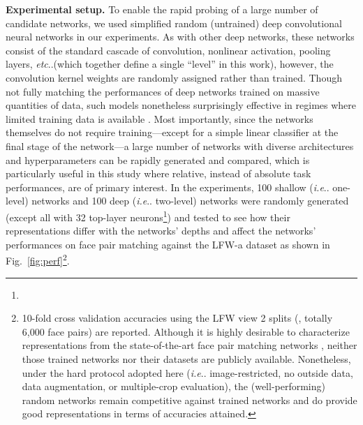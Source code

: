 \documentclass[fleqn]{article} %
\makeatletter
\DeclareRobustCommand\onedot{\futurelet\@let@token\@onedot}
\def\@onedot{\ifx\@let@token.\else.\null\fi\xspace}
\def\eg{\emph{e.g}\onedot} \def\Eg{\emph{E.g}\onedot}
\def\ie{\emph{i.e}\onedot} \def\Ie{\emph{I.e}\onedot}
\def\etc{\emph{etc}\onedot} \def\vs{\emph{vs}\onedot}
\makeatother
\begin{document}
\newcommand{\expperf}{10-fold cross validation accuracies using the LFW view 2 splits (\cite{LFWTech}, totally 6,000 face pairs) are reported.
Although it is highly desirable to characterize representations from the state-of-the-art face pair matching networks \cite{taigman2014deepface, sun2014deep, schroff2015facenet}, neither those trained networks nor their datasets are publicly available.
Nonetheless, under the hard protocol adopted here (\ie image-restricted, no outside data, data augmentation, or multiple-crop evaluation), the (well-performing) random networks remain competitive against trained networks and do provide good representations in terms of accuracies attained.
} 

{\bf Experimental setup.}
To enable the rapid probing of a large number of candidate networks, we used simplified random (untrained) deep convolutional neural networks \cite{cox2011beyond, sthor} in our experiments.
As with other deep networks, these networks consist of the standard cascade of convolution, nonlinear activation, pooling layers, \etc (which together define a single ``level'' in this work), however, the convolution kernel weights are randomly assigned rather than trained.
Though not fully matching the performances of deep networks trained on massive quantities of data, such models nonetheless surprisingly effective in regimes where limited training data is available \cite{cox2011beyond}. %
Most importantly, since the networks themselves do not require training---except for a simple linear classifier at the final stage of the network---a large number of networks with diverse architectures and hyperparameters can be rapidly generated and compared, which is particularly useful in this study where relative, instead of absolute task performances, are of primary interest.
In the experiments, 100 shallow (\ie one-level) networks and 100 deep (\ie two-level) networks {were} randomly generated (except all with 32 top-layer neurons\footnote{\expsettings}) and tested to see how their representations differ with the networks' depths and affect the networks' performances on face pair matching against the LFW-a dataset \cite{wolf2011effective} as shown in Fig.~\ref{fig:perf}\footnote{\expperf}.
\end{document}
